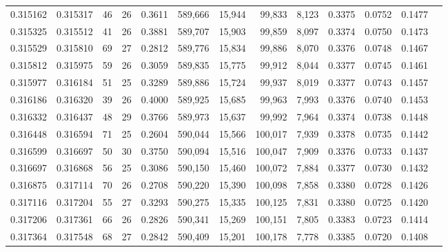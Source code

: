 \begin{tabular}{rrrrrrrrrrrrr}
0.315162 & 0.315317 &  46 &  26 &                                     0.3611 & 589,666 &  15,944 &  99,833 &   8,123 & 0.3375 & 0.0752 & 0.1477 \\
0.315325 & 0.315512 &  41 &  26 &                                     0.3881 & 589,707 &  15,903 &  99,859 &   8,097 & 0.3374 & 0.0750 & 0.1473 \\
0.315529 & 0.315810 &  69 &  27 &                                     0.2812 & 589,776 &  15,834 &  99,886 &   8,070 & 0.3376 & 0.0748 & 0.1467 \\
0.315812 & 0.315975 &  59 &  26 &                                     0.3059 & 589,835 &  15,775 &  99,912 &   8,044 & 0.3377 & 0.0745 & 0.1461 \\
0.315977 & 0.316184 &  51 &  25 &                                     0.3289 & 589,886 &  15,724 &  99,937 &   8,019 & 0.3377 & 0.0743 & 0.1457 \\
0.316186 & 0.316320 &  39 &  26 &                                     0.4000 & 589,925 &  15,685 &  99,963 &   7,993 & 0.3376 & 0.0740 & 0.1453 \\
0.316332 & 0.316437 &  48 &  29 &                                     0.3766 & 589,973 &  15,637 &  99,992 &   7,964 & 0.3374 & 0.0738 & 0.1448 \\
0.316448 & 0.316594 &  71 &  25 &                                     0.2604 & 590,044 &  15,566 & 100,017 &   7,939 & 0.3378 & 0.0735 & 0.1442 \\
0.316599 & 0.316697 &  50 &  30 &                                     0.3750 & 590,094 &  15,516 & 100,047 &   7,909 & 0.3376 & 0.0733 & 0.1437 \\
0.316697 & 0.316868 &  56 &  25 &                                     0.3086 & 590,150 &  15,460 & 100,072 &   7,884 & 0.3377 & 0.0730 & 0.1432 \\
0.316875 & 0.317114 &  70 &  26 &                                     0.2708 & 590,220 &  15,390 & 100,098 &   7,858 & 0.3380 & 0.0728 & 0.1426 \\
0.317116 & 0.317204 &  55 &  27 &                                     0.3293 & 590,275 &  15,335 & 100,125 &   7,831 & 0.3380 & 0.0725 & 0.1420 \\
0.317206 & 0.317361 &  66 &  26 &                                     0.2826 & 590,341 &  15,269 & 100,151 &   7,805 & 0.3383 & 0.0723 & 0.1414 \\
0.317364 & 0.317548 &  68 &  27 &                                     0.2842 & 590,409 &  15,201 & 100,178 &   7,778 & 0.3385 & 0.0720 & 0.1408 \\

\end{tabular}
